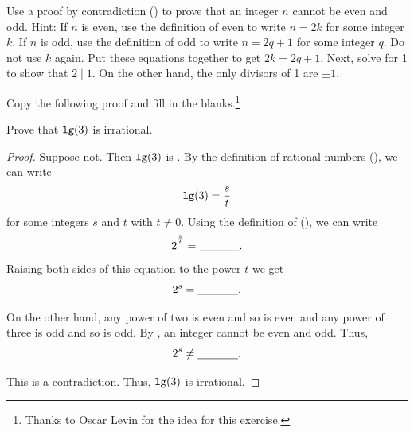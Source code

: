 \begin{exer}[\exerE] %
\label{exer_not_both_even_odd}
    Use a proof by contradiction () to prove that an integer $n$ cannot be even and odd. Hint: If $n$ is even, use the definition of even to write $n = 2k$ for some integer $k$.  If $n$ is odd, use the definition of odd to write $n=2q+1$ for some integer $q$. Do not use $k$ again.  Put these equations together to get $2k=2q+1$.  Next, solve for 1 to show that $2 \mid 1$.  On the other hand, the only divisors of 1 are $\pm1$.
\end{exer}

\begin{exer}[\exerE] %
\label{exer_lg3_irrat}
    Copy the following proof and fill in the blanks.\footnote{Thanks to Oscar Levin for the idea for this exercise.}
    
    Prove that $\texttt{lg}(3)$ is irrational. 

    \begin{proof}
        Suppose not.  Then $\texttt{lg}(3)$ is \underline{\hspace{.5 in}}.  By the definition of rational numbers (), we can write 
            $$\texttt{lg}(3) = \frac{s}{t}$$ 
        for some integers $s$ and $t$ with $t \neq 0$.  Using the definition of  (), we can write
            $$2^{^{\frac{s}{t}}} = \underline{\hspace{.5 in}} .$$
        Raising both sides of this equation to the power $t$ we get 
            $$2^s = \underline{\hspace{.5 in}} .$$

        On the other hand, any power of two is even and so \underline{\hspace{.5 in}} is even and any power of three is odd and so \underline{\hspace{.5 in}} is odd.  By , an integer cannot be even and odd.  Thus, 
            $$2^s \neq \underline{\hspace{.5 in}}.$$  

        This is a contradiction.  Thus, $\texttt{lg}(3)$ is irrational.
    \end{proof}
\end{exer}
